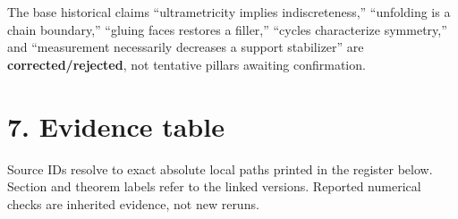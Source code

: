 \documentclass[10pt,letterpaper]{article}
\begin{document}
The base historical claims ``ultrametricity implies indiscreteness,'' ``unfolding is a chain boundary,'' ``gluing faces restores a filler,'' ``cycles characterize symmetry,'' and ``measurement necessarily decreases a support stabilizer'' are \textbf{corrected/rejected}, not tentative pillars awaiting confirmation.\par

\section*{7. Evidence table}

Source IDs resolve to exact absolute local paths printed in the register below. Section and theorem labels refer to the linked versions. Reported numerical checks are inherited evidence, not new reruns.\par
\end{document}
